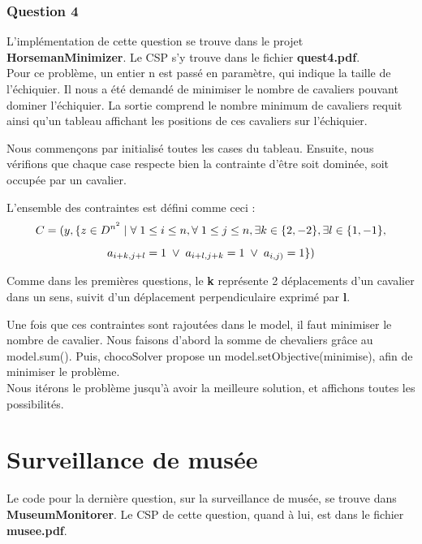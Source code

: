 \documentclass{article}
\begin{document}
\subsubsection{Question 4}
L'implémentation de cette question se trouve dans le projet \textbf{HorsemanMinimizer}. Le CSP s'y trouve dans le fichier \textbf{quest4.pdf}. \\

Pour ce problème, un entier n est passé en paramètre, qui indique la taille de l'échiquier. Il nous a été demandé de minimiser le nombre de cavaliers pouvant dominer l'échiquier. La sortie comprend le nombre minimum de cavaliers requit ainsi qu'un tableau affichant les positions de ces cavaliers sur l'échiquier.

Nous commençons par initialisé toutes les cases du tableau. Ensuite, nous vérifions que chaque case respecte bien la contrainte d'être soit dominée, soit occupée par un cavalier. 

L'ensemble des contraintes est défini comme ceci :  
  $$ C = (y, \{z \in D^{n^2} \hspace{0.1cm} | \hspace{0.1cm} \forall \hspace{0.1cm} 1 \leq i \leq n, \forall \hspace{0.1cm} 1 \leq j \leq n, \exists k \in \{2,-2\}, \exists l \in \{1,-1\},$$
 $$ a_{i+k,j+l}=1 \hspace{0.1cm} \vee \hspace{0.1cm} a_{i+l,j+k}=1 \hspace{0.1cm} \vee \hspace{0.1cm} a_{i,j)} = 1\}) $$ 
 
 Comme dans les premières questions, le \textbf{k} représente 2 déplacements d'un cavalier dans un sens, suivit d'un déplacement perpendiculaire exprimé par \textbf{l}. 
 
 Une fois que ces contraintes sont rajoutées dans le model, il faut minimiser le nombre de cavalier. Nous faisons d'abord la somme de chevaliers grâce au model.sum(). Puis, chocoSolver propose un model.setObjective(minimise), afin de minimiser le problème.\\
 
 Nous itérons le problème jusqu'à avoir la meilleure solution, et affichons toutes les possibilités.					
 
\section{Surveillance de musée}
Le code pour la dernière question, sur la surveillance de musée, se trouve dans \textbf{MuseumMonitorer}. Le CSP de cette question, quand à lui, est dans le fichier \textbf{musee.pdf}.\\
\end{document}

